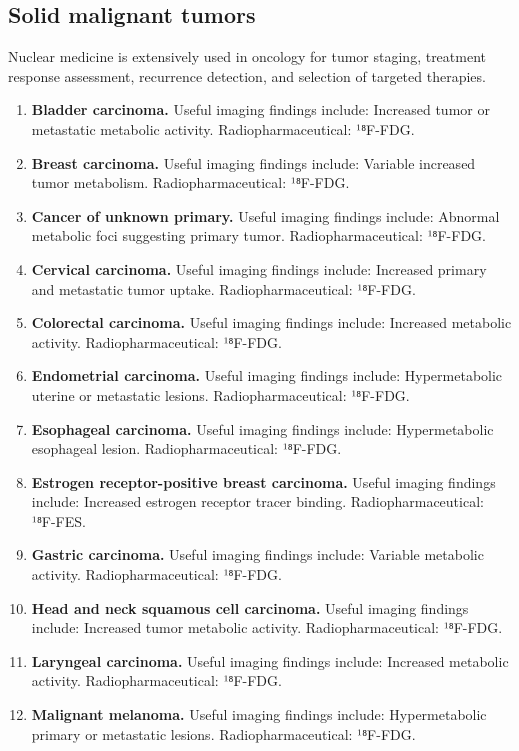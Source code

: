 \subsection{Solid malignant tumors}
Nuclear medicine is extensively used in oncology for tumor staging, treatment response assessment, recurrence detection, and selection of targeted therapies.
\begin{enumerate}[leftmargin=*,itemsep=0.45em,topsep=0.4em]
\item \textbf{Bladder carcinoma.} Useful imaging findings include: Increased tumor or metastatic metabolic activity. Radiopharmaceutical: ¹⁸F-FDG.
\item \textbf{Breast carcinoma.} Useful imaging findings include: Variable increased tumor metabolism. Radiopharmaceutical: ¹⁸F-FDG.
\item \textbf{Cancer of unknown primary.} Useful imaging findings include: Abnormal metabolic foci suggesting primary tumor. Radiopharmaceutical: ¹⁸F-FDG.
\item \textbf{Cervical carcinoma.} Useful imaging findings include: Increased primary and metastatic tumor uptake. Radiopharmaceutical: ¹⁸F-FDG.
\item \textbf{Colorectal carcinoma.} Useful imaging findings include: Increased metabolic activity. Radiopharmaceutical: ¹⁸F-FDG.
\item \textbf{Endometrial carcinoma.} Useful imaging findings include: Hypermetabolic uterine or metastatic lesions. Radiopharmaceutical: ¹⁸F-FDG.
\item \textbf{Esophageal carcinoma.} Useful imaging findings include: Hypermetabolic esophageal lesion. Radiopharmaceutical: ¹⁸F-FDG.
\item \textbf{Estrogen receptor-positive breast carcinoma.} Useful imaging findings include: Increased estrogen receptor tracer binding. Radiopharmaceutical: ¹⁸F-FES.
\item \textbf{Gastric carcinoma.} Useful imaging findings include: Variable metabolic activity. Radiopharmaceutical: ¹⁸F-FDG.
\item \textbf{Head and neck squamous cell carcinoma.} Useful imaging findings include: Increased tumor metabolic activity. Radiopharmaceutical: ¹⁸F-FDG.
\item \textbf{Laryngeal carcinoma.} Useful imaging findings include: Increased metabolic activity. Radiopharmaceutical: ¹⁸F-FDG.
\item \textbf{Malignant melanoma.} Useful imaging findings include: Hypermetabolic primary or metastatic lesions. Radiopharmaceutical: ¹⁸F-FDG.

\end{enumerate}
